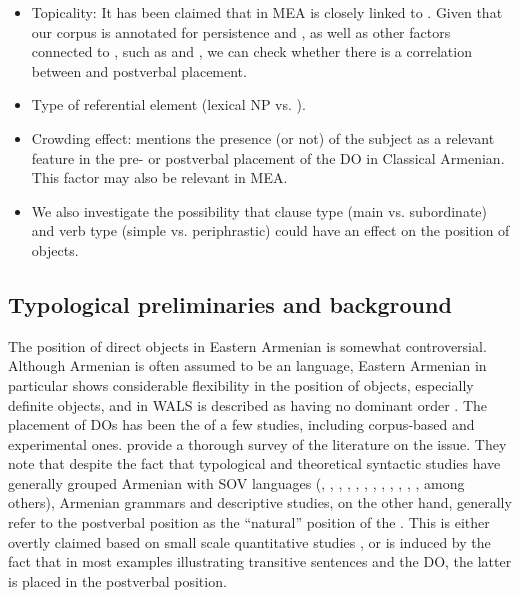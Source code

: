 \documentclass[output=paper,colorlinks,citecolor=brown,draftmode]{langscibook}
\begin{document}
\begin{itemize}
    \item Topicality: It has been claimed that  in MEA is closely linked to  \citep{hodgson_relative_2019}. Given that our corpus is annotated for  persistence and , as well as other factors connected to , such as  and , we can check whether there is a correlation between  and postverbal placement.
    \item Type of referential element (lexical NP vs. ).
    \item Crowding effect: \citet{hayrapetyan_ui_1981} mentions the presence (or not) of the subject as a relevant feature in the pre- or postverbal placement of the DO in Classical Armenian. This factor may also be relevant in MEA.
    \item We also investigate the possibility that clause type (main vs. subordinate) and verb type (simple vs. periphrastic) could have an effect on the position of objects.
\end{itemize}

\subsection{Typological preliminaries and background}\label{Armenian:ss:1.1}
\largerpage
The position of direct objects in Eastern Armenian is somewhat controversial. Although Armenian is often assumed to be an  language, Eastern Armenian in particular shows considerable flexibility in the position of objects, especially definite objects, and in WALS is described as having no dominant order \citep{dryer_order_2013_OV}. The placement of DOs has been the  of a few studies, including corpus-based and experimental ones. \citet{samvelian_persistence_2023} provide a thorough survey of the literature on the issue. They note that despite the fact that typological and theoretical syntactic studies have generally grouped Armenian with SOV languages (\citealt[227--228]{der-houssikian_semantic_1978}, \citealt[286, 310]{dryer_aspects_1998}, \citealt{dum-tragut_word_2002}, \citealt[190]{giorgi_word_2016}, \citealt[625]{hawkins_implicational_1979}, \citeyear[286]{hawkins_word_1983}, \citealt[6]{hodgson_discourse_2013}, \citealt[81]{kahnemuyipour_second_2011,kahnemuyipour_positional_2017}, \citealt[8]{kozintseva_modern_1995}, \citealt[263]{minassian_grammaire_1980}, \citealt[101]{tamrazian_focus_1991}, \citeyear[7]{tamrazian_syntax_1994}, among others), Armenian grammars and descriptive studies, on the other hand, generally refer to the postverbal position as the “natural” position of the . This is either overtly claimed based on small scale quantitative studies \citep{badikyan_zamanakakic_1976}, or is induced by the fact that in most examples illustrating transitive sentences and the DO, the latter is placed in the postverbal position.
\end{document}
